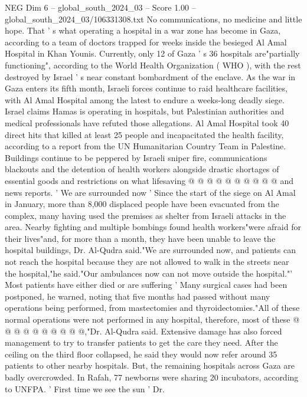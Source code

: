 \begin{textsample}{NEG Dim 6 – global\_south\_2024\_03 – Score 1.00 – global\_south\_2024\_03/106331308.txt}  \label{ex:f6_neg_390}
No communications, no medicine and little hope.
That ' s what operating a hospital in a war zone has become in Gaza, according to a team of doctors trapped for weeks inside the besieged Al Amal Hospital in Khan Younis.
Currently, only 12 of Gaza ' s 36 hospitals are"partially functioning", according to the World Health Organization ( WHO ), with the rest destroyed by Israel ' s near constant bombardment of the enclave.
As the war in Gaza enters its fifth month, Israeli forces continue to raid healthcare facilities, with Al Amal Hospital among the latest to endure a weeks-long deadly siege.
Israel claims Hamas is operating in hospitals, but Palestinian authorities and medical professionals have refuted those allegations.
Al Amal Hospital took 40 direct hits that killed at least 25 people and incapacitated the health facility, according to a report from the UN Humanitarian Country Team in Palestine.
Buildings continue to be peppered by Israeli sniper fire, communications blackouts and the detention of health workers alongside drastic shortages of essential goods and restrictions on what lifesaving @ @ @ @ @ @ @ @ @ @ and news reports. ' We are surrounded now ' Since the start of the siege on Al Amal in January, more than 8,000 displaced people have been evacuated from the complex, many having used the premises as shelter from Israeli attacks in the area.
Nearby fighting and multiple bombings found health workers"were afraid for their lives"and, for more than a month, they have been unable to leave the hospital buildings, Dr.
Al-Qudra said."We are surrounded now, and patients can not reach the hospital because they are not allowed to walk in the streets near the hospital,"he said."Our ambulances now can not move outside the hospital."' Most patients have either died or are suffering ' Many surgical cases had been postponed, he warned, noting that five months had passed without many operations being performed, from mastectomies and thyroidectomies."All of these normal operations were not performed in any hospital, therefore, most of these @ @ @ @ @ @ @ @ @ @,"Dr.
Al-Qudra said.
Extensive damage has also forced management to try to transfer patients to get the care they need.
After the ceiling on the third floor collapsed, he said they would now refer around 35 patients to other nearby hospitals.
But, the remaining hospitals across Gaza are badly overcrowded.
In Rafah, 77 newborns were sharing 20 incubators, according to UNFPA. ' First time we see the sun ' Dr.

\end{textsample}
